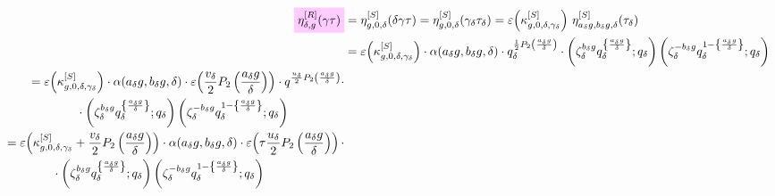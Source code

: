 \documentclass{article}
\begin{document}
\begin{align}
  \defineNotation[eta-delta-g-gamma-tau-Robins]{\eta_{\delta,g}^{[R]}(\gamma\tau)}
  &=
    \eta_{g,0,\delta}^{[S]}(\delta\gamma\tau)
  =
    \eta_{g,0,\delta}^{[S]}(\gamma_\delta\tau_\delta)
   =
    \unityPower{\kappa_{g,0,\delta,\gamma_\delta}^{[S]}}\,
    \eta_{a_\delta g, b_\delta g,\delta}^{[S]}(\tau_\delta)
  \notag\\
  &=
    \unityPower{\kappa_{g,0,\delta,\gamma_\delta}^{[S]}}
    \cdot
    \alpha(a_\delta g, b_\delta g,\delta)
    \cdot
    q_\delta^{{\frac{1}{2} P_2\left(\frac{a_\delta g}{\delta}\right)}}
    \cdot
    \left(
    \zeta_\delta^{b_\delta g} q_\delta^{\left\{\frac{a_\delta g}{\delta}\right\}}
    ;
    q_\delta
    \right)
    \left(
    \zeta_\delta^{-{b_\delta g}} q_\delta^{1-\left\{\frac{a_\delta g}{\delta}\right\}}
    ;
    q_\delta
    \right)
  \notag\\
  \begin{split}
  &=
  \unityPower{\kappa_{g,0,\delta,\gamma_\delta}^{[S]}}
  \cdot
  \alpha(a_\delta g, b_\delta g,\delta)
  \cdot
  \unityPower{{\frac{v_\delta}{2} P_2\left(\frac{a_\delta g}{\delta}\right)}}
  \cdot
  q^{{\frac{u_\delta}{2} P_2\left(\frac{a_\delta g}{\delta}\right)}}
  \cdot
  \\
  &\qquad\qquad
  \cdot
  \left(
    \zeta_\delta^{b_\delta g} q_\delta^{\left\{\frac{a_\delta g}{\delta}\right\}}
    ;
    q_\delta
  \right)
  \left(
    \zeta_\delta^{-{b_\delta g}} q_\delta^{1-\left\{\frac{a_\delta g}{\delta}\right\}}
    ;
    q_\delta
  \right)
  \end{split}
  \notag\\
  \begin{split}
    &=
    \unityPower{
      \kappa_{g,0,\delta,\gamma_\delta}^{[S]}
      +
      \frac{v_\delta}{2} P_2\left(\frac{a_\delta g}{\delta}\right)
    }
    \cdot
    \alpha(a_\delta g, b_\delta g,\delta)
    \cdot
    \unityPower{\tau
      \frac{u_\delta}{2} P_2\left(\frac{a_\delta g}{\delta}\right)}
    \cdot
    \\
    &\qquad\qquad
    \cdot
    \left(
      \zeta_\delta^{b_\delta g} q_\delta^{\left\{\frac{a_\delta g}{\delta}\right\}}
      ;
      q_\delta
    \right)
    \left(
      \zeta_\delta^{-{b_\delta g}} q_\delta^{1-\left\{\frac{a_\delta g}{\delta}\right\}}
      ;
      q_\delta
    \right)
  \end{split}
  \label{eq:eta_delta-g^[R](gamma*tau)}
\end{align}
\end{document}
